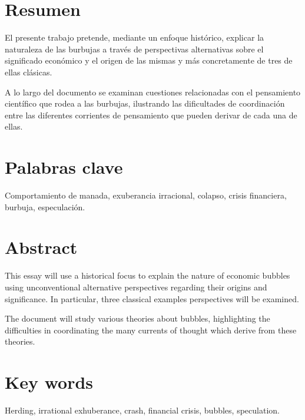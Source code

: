 \section*{Resumen}

El presente trabajo pretende, mediante un enfoque histórico, explicar la
naturaleza de las burbujas a través de perspectivas alternativas sobre
el significado económico y el origen de las mismas y más concretamente
de tres de ellas clásicas.

A lo largo del documento se examinan cuestiones relacionadas con el
pensamiento científico que rodea a las burbujas, ilustrando las
dificultades de coordinación entre las diferentes corrientes de
pensamiento que pueden derivar de cada una de ellas.

\section*{Palabras clave}

Comportamiento de manada, exuberancia irracional, colapso, crisis financiera, burbuja, especulación.

\section*{Abstract}

This essay will use a historical focus to explain the nature of economic bubbles using unconventional alternative perspectives regarding their origins and significance.  In particular, three classical examples perspectives will be examined.

The document will study various theories about bubbles, highlighting the difficulties in coordinating the many currents of thought which derive from these theories.

\section*{Key words}

Herding, irrational exhuberance, crash, financial crisis, bubbles, speculation.


